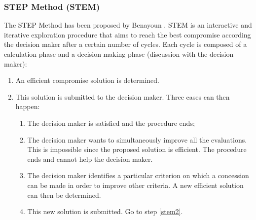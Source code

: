 
\subsubsection{STEP Method (STEM)}
The STEP Method has been proposed by Benayoun \cite{benayoun71}. STEM is an interactive and iterative exploration procedure that aims to reach the best compromise according the decision maker after a certain number of cycles. Each cycle is composed of a calculation phase and a decision-making phase (discussion with the decision maker):
\begin{enumerate}
\item An efficient compromise solution is determined.
\item \label{stem2} This solution is submitted to the decision maker. Three cases can then happen:
	\begin{enumerate}
	\item The decision maker is satisfied and the procedure ends;
	\item The decision maker wants to simultaneously improve all the evaluations. This is impossible since the proposed solution is efficient. The procedure ends and cannot help the decision maker.
	\item The decision maker identifies a particular criterion on which a concession can be made in order to improve other criteria. A new efficient solution can then be determined.
	\item This new solution is submitted. Go to step \ref{stem2}.
	\end{enumerate}
\end{enumerate}

